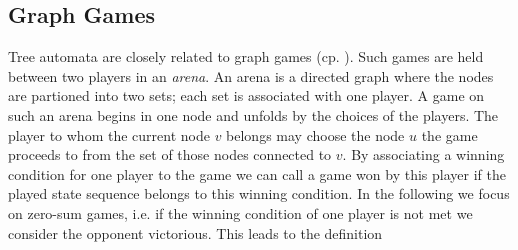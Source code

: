 \subsection{Graph Games}
Tree automata are closely related to graph games (cp.
\cite[Chapter 9]{AutoLogInfGames}). Such games are held between two players in
an \emph{arena}. An arena is a directed graph where the nodes are partioned
into two sets; each set is associated with one player. A game on such an arena
begins in one node and unfolds by the choices of the players. The player to
whom the current node $v$ belongs may choose the node $u$ the game proceeds to
from the set of those nodes connected to $v$. By associating a winning
condition for one player to the game we can call a game won by this player if
the played state sequence belongs to this winning condition. In the following 
we focus on zero-sum games, i.e. if the winning condition of one player is not 
met we consider the opponent victorious. This leads to the definition
